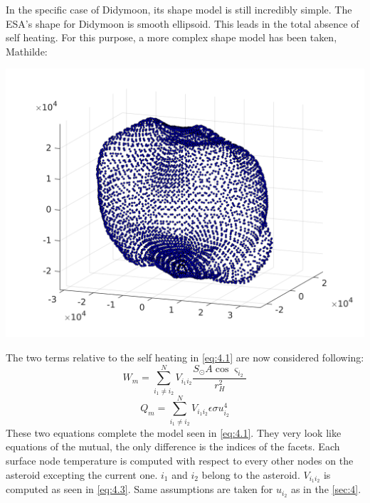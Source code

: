 In the specific case of Didymoon, its shape model is still incredibly simple. The ESA's shape for Didymoon is smooth ellipsoid. This leads in the total absence of self heating. For this purpose, a more complex shape model has been taken, Mathilde:
\begin{center}
    \includegraphics[width=\linewidth]{rsc/mathilde.png}
    \label{fig:5.2}
\end{center}

The two terms relative to the self heating in \autoref{eq:4.1} are now considered following:
\begin{equation}
    W_m=\sum_{i_1\neq i_2}^N V_{i_1i_2}\frac{S_{\odot}A\cos\varsigma_{i_2}}{r_H^2}
    \label{eq:5.1}
\end{equation}
\begin{equation}
    Q_m=\sum_{i_1\neq i_2}^N V_{i_1i_2}\epsilon\sigma u_{i_2}^4
    \label{eq:5.2}
\end{equation}
These two equations complete the model seen in \autoref{eq:4.1}. They very look like equations of the mutual, the only difference is the indices of the facets. Each surface node temperature is computed with respect to every other nodes on the asteroid excepting the current one. $i_1$ and $i_2$ belong to the asteroid. $V_{i_1i_2}$ is computed as seen in \autoref{eq:4.3}. Same assumptions are taken for $u_{i_2}$ as in the \autoref{sec:4}.

